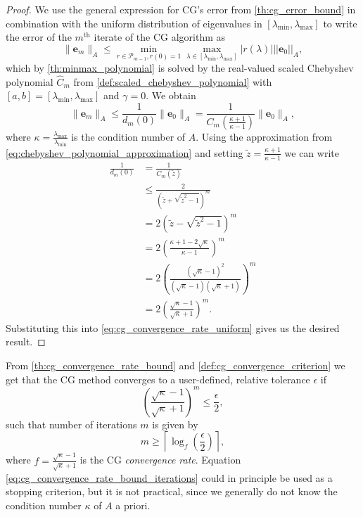 \begin{proof}
We use the general expression for CG's error from \cref{th:cg_error_bound} in combination with the uniform distribution of eigenvalues in $[\lambda_{\text{min}}, \lambda_{\text{max}}]$ to write the error of the $m^{\text{th}}$ iterate of the CG algorithm as
\begin{equation}
  \|\mathbf{e}_m\|_A \leq \min_{r \in \mathcal{P}_{m-1}, r(0) = 1} \max_{\lambda \in [\lambda_{\text{min}}, \lambda_{\text{max}}]} |r(\lambda)| ||\mathbf{e}_0||_A,
\end{equation}
which by \cref{th:minmax_polynomial} is solved by the real-valued scaled Chebyshev polynomial $\hat{C}_m$ from \cref{def:scaled_chebyshev_polynomial} with $[a,b] = [\lambda_{\text{min}},\lambda_{\text{max}}]$ and $\gamma=0$. We obtain
\begin{equation}
   \|\mathbf{e}_m\|_A \leq \frac{1}{d_m(0)}\|\mathbf{e}_0\|_A =\frac{1}{C_m(\frac{\kappa + 1}{\kappa - 1})}\|\mathbf{e}_0\|_A,
  \label{eq:cg_convergence_rate_uniform}
\end{equation}
where $\kappa = \frac{\lambda_{\text{max}}}{\lambda_{\text{min}}}$ is the condition number of $A$. Using the approximation from \cref{eq:chebyshev_polynomial_approximation} and setting $\tilde{z} = \frac{\kappa + 1}{\kappa -1}$ we can write
\begin{align*}
  \frac{1}{d_m(0)} &= \frac{1}{C_m(\tilde{z})}\\
  &\leq \frac{2}{\left(\tilde{z} + \sqrt{\tilde{z}^2-1}\right)^m}\\
  &=2\left(\tilde{z} - \sqrt{\tilde{z}^2-1}\right)^m\\
  &=2\left(\frac{\kappa + 1 - 2\sqrt{\kappa}}{\kappa - 1}\right)^m\\
  &=2\left(\frac{(\sqrt{\kappa} - 1)^2}{(\sqrt{\kappa} - 1)(\sqrt{\kappa} + 1)}\right)^m\\
  &=2\left(\frac{\sqrt{\kappa} - 1}{\sqrt{\kappa} + 1}\right)^{m}.
\end{align*}
Substituting this into \cref{eq:cg_convergence_rate_uniform} gives us the desired result.
\end{proof}
From \cref{th:cg_convergence_rate_bound} and \cref{def:cg_convergence_criterion} we get that the CG method converges to a user-defined, relative tolerance $\epsilon$ if
\begin{equation*}
  \left(\frac{\sqrt{\kappa} - 1}{\sqrt{\kappa} + 1}\right)^{m} \leq \frac{\epsilon}{2},
\end{equation*}
such that number of iterations $m$ is given by
\begin{equation}
  m \geq \left\lceil{\log_f\left(\frac{\epsilon}{2}\right)}\right\rceil,
  \label{eq:cg_convergence_rate_bound_iterations}
\end{equation}
where $f = \frac{\sqrt{\kappa} - 1}{\sqrt{\kappa} + 1}$ is the CG \textit{convergence rate}. Equation \ref{eq:cg_convergence_rate_bound_iterations} could in principle be used as a stopping criterion, but it is not practical, since we generally do not know the condition number $\kappa$ of $A$ a priori.

